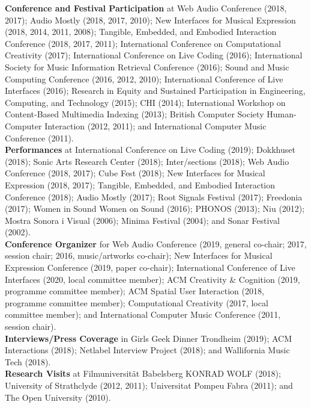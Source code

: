 \documentclass[10pt, a4paper]{article}
\begin{document}
{\textbf{Conference and Festival Participation}} at Web Audio Conference (2018, 2017); Audio Mostly (2018, 2017, 2010); New Interfaces for Musical Expression (2018, 2014, 2011, 2008); Tangible, Embedded, and Embodied Interaction Conference (2018, 2017, 2011); International Conference on Computational Creativity (2017); International Conference on Live Coding (2016); International Society for Music Information Retrieval Conference (2016); Sound and Music Computing Conference (2016, 2012, 2010); International Conference of Live Interfaces (2016); Research in Equity and Sustained Participation in Engineering, Computing, and Technology (2015); CHI (2014); International Workshop on Content-Based Multimedia Indexing (2013); British Computer Society Human-Computer Interaction (2012, 2011); and International Computer Music Conference (2011).\\

{\textbf{Performances}} at International Conference on Live Coding (2019); Dokkhuset (2018); Sonic Arts Research Center (2018); Inter/sections (2018); Web Audio Conference (2018, 2017); Cube Fest (2018); New Interfaces for Musical Expression (2018, 2017); Tangible, Embedded, and Embodied Interaction Conference (2018); Audio Mostly (2017); Root Signals Festival (2017); Freedonia (2017); Women in Sound Women on Sound (2016); PHONOS (2013); Niu (2012); Mostra Sonora i Visual (2006); Minima Festival (2004); and Sonar Festival (2002).\\

{\textbf{Conference Organizer}} for Web Audio Conference (2019, general co-chair; 2017, session chair; 2016, music/artworks co-chair); New Interfaces for Musical Expression Conference (2019, paper co-chair); International Conference of Live Interfaces (2020, local committee member); ACM Creativity \& Cognition (2019, programme committee member); ACM Spatial User Interaction (2018, programme committee member); Computational Creativity (2017, local committee member); and International Computer Music Conference (2011, session chair).\\

{\textbf{Interviews/Press Coverage}} in Girls Geek Dinner Trondheim (2019); ACM Interactions (2018); Netlabel Interview Project (2018); and Wallifornia Music Tech (2018).\\

{\textbf{Research Visits}} at Filmuniversität Babelsberg KONRAD WOLF (2018); University of Strathclyde (2012, 2011); Universitat Pompeu Fabra (2011); and The Open University (2010).\\
\end{document}
